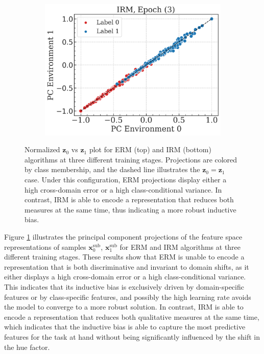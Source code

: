 \begin{figure}[H]
\begin{subfigure}[b]{0.32\textwidth}
        \includegraphics[width=\textwidth]{img/results_discussion/datashift/L_5.png}
    \end{subfigure}

    \caption{
    Normalized $\bm{z}_0$ vs $\bm{z}_1$ plot for ERM (top) and IRM (bottom) algorithms at three different
    training stages. Projections are colored by class membership, and the dashed line illustrates the 
    $\bm{z}_0 = \bm{z}_1$ case. Under this configuration, ERM projections display either a high cross-domain
    error or a high class-conditional variance. In contrast, IRM is able to encode a representation
    that reduces both measures at the same time, thus indicating a more robust inductive bias.
    }
    \label{fig:PCA_shift}
\end{figure}

   
Figure \ref{fig:PCA_shift} illustrates the principal component projections of the feature space representations
of samples $\bm{x}_0^{\text{sub}}$, $\bm{x}_1^{\text{sub}}$ for ERM and IRM algorithms at three 
different training stages. These results show that ERM is unable to encode a representation that is both discriminative and invariant
to domain shifts, as it either displays a high cross-domain error or a high class-conditional variance.
This indicates that its inductive bias is exclusively driven by domain-specific features or by class-specific 
features, and possibly the high learning rate avoids the model to converge to a more robust solution. 
In contrast, IRM is able to encode a representation that reduces both qualitative measures at the same time,
which indicates that the inductive bias is able to capture the most predictive features for the task at hand
without being significantly influenced by the shift in the hue factor. \\  

